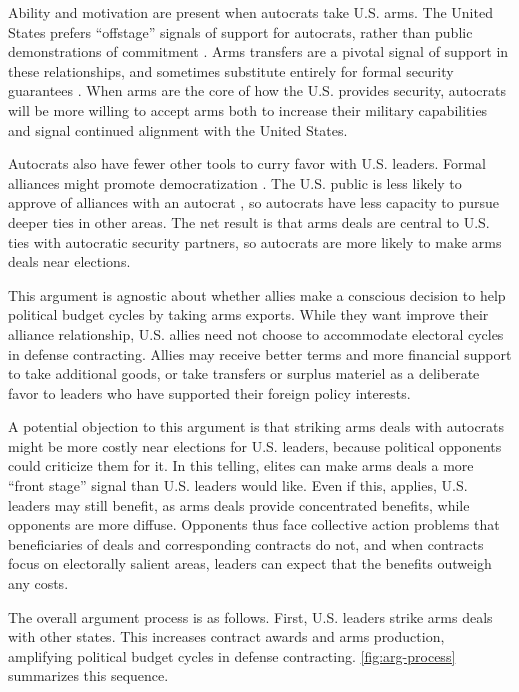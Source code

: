 \documentclass[12pt]{article}
\begin{document}
Ability and motivation are present when autocrats take U.S. arms. 
The United States prefers ``offstage'' signals of support for autocrats, rather than public demonstrations of commitment \citep{McManusYarhi-Milo2017}.
Arms transfers are a pivotal signal of support in these relationships, and sometimes substitute entirely for formal security guarantees \citep{Yarhi-Miloetal2016}. 
When arms are the core of how the U.S. provides security, autocrats will be more willing to accept arms both to increase their military capabilities and signal continued alignment with the United States.


Autocrats also have fewer other tools to curry favor with U.S. leaders.
Formal alliances might promote democratization \citep{GiblerWolford2006, Warren2016}.
The U.S. public is less likely to approve of alliances with an autocrat \citep{Alley2022}, so autocrats have less capacity to pursue deeper ties in other areas. 
The net result is that arms deals are central to U.S. ties with autocratic security partners, so autocrats are more likely to make arms deals near elections. 


This argument is agnostic about whether allies make a conscious decision to help political budget cycles by taking arms exports.
While they want improve their alliance relationship, U.S. allies need not choose to accommodate electoral cycles in defense contracting.
Allies may receive better terms and more financial support to take additional goods, or take transfers or surplus materiel as a deliberate favor to leaders who have supported their foreign policy interests. 


A potential objection to this argument is that striking arms deals with autocrats might be more costly near elections for U.S. leaders, because political opponents could criticize them for it. 
In this telling, elites can make arms deals a more ``front stage'' signal than U.S. leaders would like. 
Even if this, applies, U.S. leaders may still benefit, as arms deals provide concentrated benefits, while opponents are more diffuse. 
Opponents thus face collective action problems that beneficiaries of deals and corresponding contracts do not, and when contracts focus on electorally salient areas, leaders can expect that the benefits outweigh any costs. 



The overall argument process is as follows.
First, U.S. leaders strike arms deals with other states.
This increases contract awards and arms production, amplifying political budget cycles in defense contracting. 
\autoref{fig:arg-process} summarizes this sequence.
\end{document}
